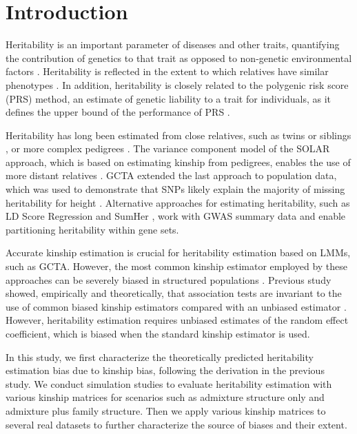 \documentclass[11pt]{article}
\begin{document}


\clearpage
	
\section{Introduction}

Heritability is an important parameter of diseases and other traits, quantifying the contribution of genetics to that trait as opposed to non-genetic environmental factors \citep{lush1949heritability}. Heritability is reflected in the extent to which relatives have similar phenotypes \citep{visscher2008heritability}. In addition, heritability is closely related to the polygenic risk score (PRS) method, an estimate of genetic liability to a trait for individuals, as it defines the upper bound of the performance of PRS \citep{choi2020tutorial}. 

Heritability has long been estimated from close relatives, such as twins or siblings \citep{falconer1996introduction}, or more complex pedigrees \citep{almasy_multipoint_1998}. The variance component model of the SOLAR approach, which is based on estimating kinship from pedigrees, enables the use of more distant relatives \citep{almasy_multipoint_1998}. GCTA extended the last approach to population data, which was used to demonstrate that SNPs likely explain the majority of missing heritability for height \citep{yang_common_2010,yang_gcta:_2011}. Alternative approaches for estimating heritability, such as LD Score Regression \citep{bulik2015ld,luo2021estimating} and SumHer \citep{speed2019sumher}, work with GWAS summary data and enable partitioning heritability within gene sets. 

Accurate kinship estimation is crucial for heritability estimation based on LMMs, such as GCTA. However, the most common kinship estimator employed by these approaches can be severely biased in structured populations \citep{ochoa_estimating_2021}. Previous study showed, empirically and theoretically, that association tests are invariant to the use of common biased kinship estimators compared with an unbiased estimator \citep{hou2023genetic}. However, heritability estimation requires unbiased estimates of the random effect coefficient, which is biased when the standard kinship estimator is used. 

In this study, we first characterize the theoretically predicted heritability estimation bias due to kinship bias, following the derivation in the previous study. We conduct simulation studies to evaluate heritability estimation with various kinship matrices for scenarios such as admixture structure only and admixture plus family structure. Then we apply various kinship matrices to several real datasets to further characterize the source of biases and their extent.
\end{document}
